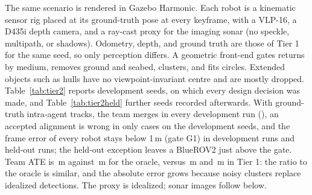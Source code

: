 \providecommand{\sonarTwoPEKFGOne}{?}\providecommand{\sonarHeldTwoPEKFGOne}{?}%
\providecommand{\sonarHeldTwoPGOne}{?}%
The same scenario is rendered in Gazebo Harmonic. Each robot is a kinematic sensor rig placed at
its ground-truth pose at every keyframe, with a VLP-16, a D435i depth camera, and a ray-cast
proxy for the imaging sonar (no speckle, multipath, or shadows). Odometry, depth, and ground
truth are those of Tier 1 for the same seed, so only perception differs. A geometric front-end
gates returns by medium, removes ground and seabed, clusters, and fits circles. Extended objects
such as hulls have no viewpoint-invariant centre and are mostly dropped. Table~\ref{tab:tier2}
reports \tierTwoRuns{} development seeds, on which every design decision was made, and
Table~\ref{tab:tier2held} \heldTwoRuns{} further seeds recorded afterwards. With ground-truth
intra-agent tracks, the team merges in every development run (\tierTwoMerged), an accepted
alignment is wrong in only \tierTwoWrong{} cases on the development seeds, and the frame error of
every robot stays below 1\,m (gate G1) in \tierTwoGOne{} development runs and \heldTwoGOne{}
held-out runs; the held-out exception leaves a BlueROV2 just above the gate. Team ATE is
\tierTwoAvatar\,m against \tierTwoOracle\,m for the oracle, versus \tierOneAvatar\,m and
\tierOneOracle\,m in Tier 1: the ratio to the oracle is similar, and the absolute error grows
because noisy clusters replace idealized detections. The proxy is idealized; sonar images follow
below.

